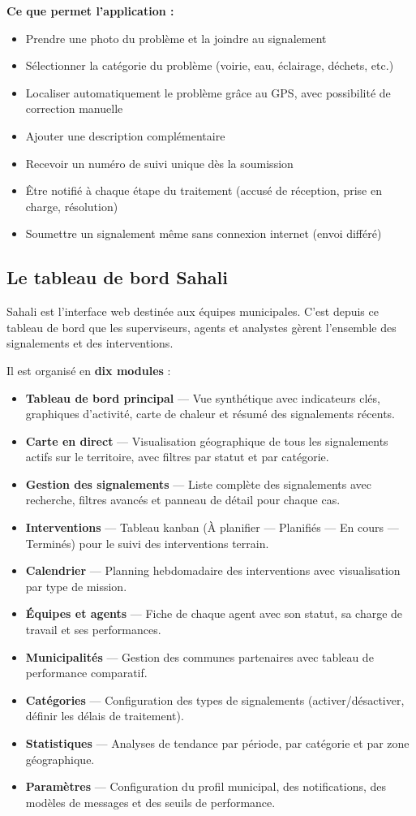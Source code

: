 \documentclass[12pt, a4paper]{article}
\newcommand{\module}[2]{%
  \item \textbf{#1} — #2
}
\begin{document}
\textbf{Ce que permet l'application :}
\begin{itemize}[leftmargin=*]
  \item Prendre une photo du problème et la joindre au signalement
  \item Sélectionner la catégorie du problème (voirie, eau, éclairage, déchets, etc.)
  \item Localiser automatiquement le problème grâce au GPS, avec possibilité de correction manuelle
  \item Ajouter une description complémentaire
  \item Recevoir un numéro de suivi unique dès la soumission
  \item Être notifié à chaque étape du traitement (accusé de réception, prise en charge, résolution)
  \item Soumettre un signalement même sans connexion internet (envoi différé)
\end{itemize}

\subsection{Le tableau de bord Sahali}

Sahali est l'interface web destinée aux équipes municipales. C'est depuis ce tableau de bord que les superviseurs, agents et analystes gèrent l'ensemble des signalements et des interventions.

Il est organisé en \textbf{dix modules} :

\begin{itemize}[leftmargin=*, label=\textbullet]
  \module{Tableau de bord principal}{Vue synthétique avec indicateurs clés, graphiques d'activité, carte de chaleur et résumé des signalements récents.}
  \module{Carte en direct}{Visualisation géographique de tous les signalements actifs sur le territoire, avec filtres par statut et par catégorie.}
  \module{Gestion des signalements}{Liste complète des signalements avec recherche, filtres avancés et panneau de détail pour chaque cas.}
  \module{Interventions}{Tableau kanban (À planifier — Planifiés — En cours — Terminés) pour le suivi des interventions terrain.}
  \module{Calendrier}{Planning hebdomadaire des interventions avec visualisation par type de mission.}
  \module{Équipes et agents}{Fiche de chaque agent avec son statut, sa charge de travail et ses performances.}
  \module{Municipalités}{Gestion des communes partenaires avec tableau de performance comparatif.}
  \module{Catégories}{Configuration des types de signalements (activer/désactiver, définir les délais de traitement).}
  \module{Statistiques}{Analyses de tendance par période, par catégorie et par zone géographique.}
  \module{Paramètres}{Configuration du profil municipal, des notifications, des modèles de messages et des seuils de performance.}
\end{itemize}
\end{document}
